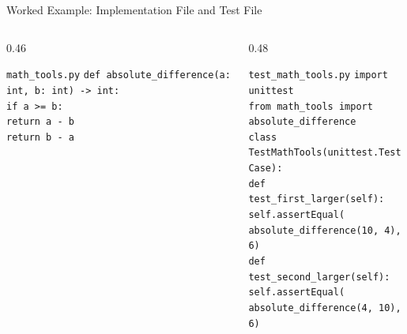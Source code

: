 \documentclass[aspectratio=169,10pt]{beamer}
\begin{document}
\begin{frame}[shrink=3]{Worked Example: Implementation File and Test File}
  \begin{columns}[T,onlytextwidth]
    \begin{column}{0.46\textwidth}
      \begin{block}{\texttt{math\_tools.py}}
        \texttt{def absolute\_difference(a: int, b: int) -> int:}\\
        \hspace*{0.18in}\texttt{if a >= b:}\\
        \hspace*{0.36in}\texttt{return a - b}\\
        \hspace*{0.18in}\texttt{return b - a}
      \end{block}
    \end{column}

    \begin{column}{0.48\textwidth}
      \begin{block}{\texttt{test\_math\_tools.py}}
        \texttt{import unittest}\\
        \texttt{from math\_tools import absolute\_difference}\\[0.05in]
        \texttt{class TestMathTools(unittest.TestCase):}\\
        \hspace*{0.18in}\texttt{def test\_first\_larger(self):}\\
        \hspace*{0.36in}\texttt{self.assertEqual(}\\
        \hspace*{0.54in}\texttt{absolute\_difference(10, 4), 6)}\\
        \hspace*{0.18in}\texttt{def test\_second\_larger(self):}\\
        \hspace*{0.36in}\texttt{self.assertEqual(}\\
        \hspace*{0.54in}\texttt{absolute\_difference(4, 10), 6)}
      \end{block}
    \end{column}
  \end{columns}
\end{frame}
\end{document}

